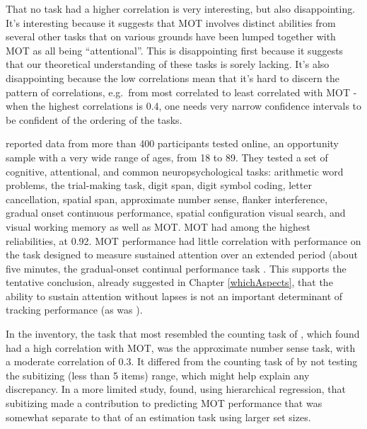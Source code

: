 \documentclass[
]{book}
\begin{document}
That no task had a higher correlation is very interesting, but also disappointing. It's interesting because it suggests that MOT involves distinct abilities from several other tasks that on various grounds have been lumped together with MOT as all being ``attentional''. This is disappointing first because it suggests that our theoretical understanding of these tasks is sorely lacking. It's also disappointing because the low correlations mean that it's hard to discern the pattern of correlations, e.g.~from most correlated to least correlated with MOT - when the highest correlations is 0.4, one needs very narrow confidence intervals to be confident of the ordering of the tasks.

\citet{trevinoBridgingCognitiveNeuropsychological2021} reported data from more than 400 participants tested online, an opportunity sample with a very wide range of ages, from 18 to 89. They tested a set of cognitive, attentional, and common neuropsychological tasks: arithmetic word problems, the trial-making task, digit span, digit symbol coding, letter cancellation, spatial span, approximate number sense, flanker interference, gradual onset continuous performance, spatial configuration visual search, and visual working memory as well as MOT. MOT had among the highest reliabilities, at 0.92. MOT performance had little correlation with performance on the task designed to measure sustained attention over an extended period (about five minutes, the gradual-onset continual performance task \citep{fortenbaughSustainedAttentionLife2015}. This supports the tentative conclusion, already suggested in Chapter \ref{whichAspects}, that the ability to sustain attention without lapses is not an important determinant of tracking performance (as was ).

In the \citet{trevinoBridgingCognitiveNeuropsychological2021} inventory, the task that most resembled the counting task of \citet{huangMeasuringInterrelationsMultiple2012}, which \citet{huangMeasuringInterrelationsMultiple2012} found had a high correlation with MOT, was the approximate number sense task, with a moderate correlation of 0.3. It differed from the counting task of \citet{huangMeasuringInterrelationsMultiple2012} by not testing the subitizing (less than 5 items) range, which might help explain any discrepancy. In a more limited study, \citet{eayrsEstablishingIndividualDifferences2018} found, using hierarchical regression, that subitizing made a contribution to predicting MOT performance that was somewhat separate to that of an estimation task using larger set sizes.
\end{document}
